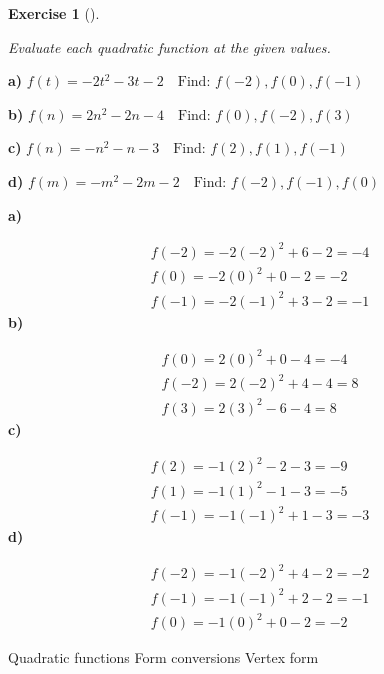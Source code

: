 \documentclass[
  letterpaper,
  DIV=11,
  numbers=noendperiod]{scrreprt}
\theoremstyle{definition}
\newtheorem{exercise}{Exercise}[chapter]
\theoremstyle{remark}
\begin{document}
\begin{exercise}[]\protect\hypertarget{exr-u7-19}{}\label{exr-u7-19}

\emph{Evaluate each quadratic function at the given values.}

\textbf{a)}
\(\displaystyle f(t) = -2t^2 - 3t - 2 \quad \text{Find: } f(-2), f(0), f(-1)\)

\textbf{b)}
\(\displaystyle f(n) = 2n^2 - 2n - 4 \quad \text{Find: } f(0), f(-2), f(3)\)

\textbf{c)}
\(\displaystyle f(n) = -n^2 - n - 3 \quad \text{Find: } f(2), f(1), f(-1)\)

\textbf{d)}
\(\displaystyle f(m) = -m^2 - 2m - 2 \quad \text{Find: } f(-2), f(-1), f(0)\)

\begin{tcolorbox}[enhanced jigsaw, opacitybacktitle=0.6, coltitle=black, arc=.35mm, colframe=quarto-callout-tip-color-frame, colback=white, bottomrule=.15mm, left=2mm, colbacktitle=quarto-callout-tip-color!10!white, titlerule=0mm, opacityback=0, title=\textcolor{quarto-callout-tip-color}{\faLightbulb}\hspace{0.5em}{🔍 View Solutions}, leftrule=.75mm, breakable, rightrule=.15mm, bottomtitle=1mm, toptitle=1mm, toprule=.15mm]

\textbf{a)}

\[
\begin{aligned}
f(-2) = -2(-2)^2 + 6 - 2 = -4 \\[4pt] f(0) = -2(0)^2 + 0 - 2 = -2 \\[4pt] f(-1) = -2(-1)^2 + 3 - 2 = -1
\end{aligned}
\] \textbf{b)}

\[
\begin{aligned}
f(0) = 2(0)^2 + 0 - 4 = -4 \\[4pt] f(-2) = 2(-2)^2 + 4 - 4 = 8 \\[4pt] f(3) = 2(3)^2 - 6 - 4 = 8
\end{aligned}
\] \textbf{c)}

\[
\begin{aligned}
f(2) = -1(2)^2 - 2 - 3 = -9 \\[4pt] f(1) = -1(1)^2 - 1 - 3 = -5 \\[4pt] f(-1) = -1(-1)^2 + 1 - 3 = -3
\end{aligned}
\] \textbf{d)}

\[
\begin{aligned}
f(-2) = -1(-2)^2 + 4 - 2 = -2 \\[4pt] f(-1) = -1(-1)^2 + 2 - 2 = -1 \\[4pt] f(0) = -1(0)^2 + 0 - 2 = -2
\end{aligned}
\]

\end{tcolorbox}

{Quadratic functions} {Form conversions} {Vertex form}

\end{exercise}
\end{document}
